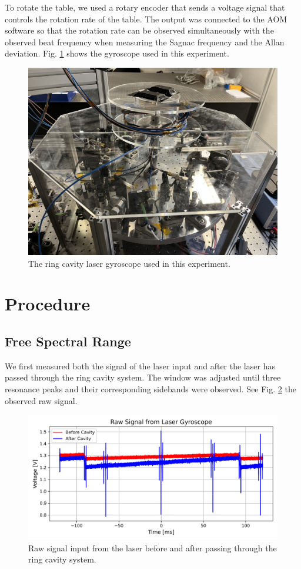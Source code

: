 \documentclass[a4paper]{report}
\numberwithin{equation}{section}
\begin{document}

To rotate the table, we used a rotary encoder that sends a voltage signal that controls the rotation rate of the table. The output 
was connected to the AOM software so that the rotation rate can be observed simultaneously with the observed beat frequency when 
measuring the Sagnac frequency and the Allan deviation. Fig. \ref{fig:exp_setup_gyroscope} shows the gyroscope used in this experiment.

\begin{figure}[h!]
	\centering
	\includegraphics[width=0.6\columnwidth]{gyroscope_picture.jpg}
	\caption{The ring cavity laser gyroscope used in this experiment.}
	\label{fig:exp_setup_gyroscope}
\end{figure}

\section{Procedure}

\subsection{Free Spectral Range}

We first measured both the signal of the laser input and after the laser
has passed through the ring cavity system. The window was adjusted until three resonance peaks and their corresponding sidebands
were observed. See Fig. \ref{fig:threeres_raw} the observed raw signal. 

\begin{figure}[h!]
	\centering
	\includegraphics[width=0.8\columnwidth]{threeres_raw.png}
	\caption{Raw signal input from the laser before and after passing through the ring 
			cavity system.}
	\label{fig:threeres_raw}
\end{figure}
\end{document}
